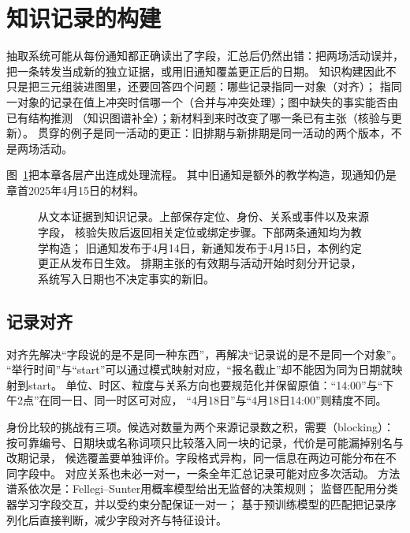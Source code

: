 \section{知识记录的构建}
\label{sec:nlp-extraction-records}

抽取系统可能从每份通知都正确读出了字段，汇总后仍然出错：把两场活动误并，
把一条转发当成新的独立证据，或用旧通知覆盖更正后的日期。
知识构建因此不只是把三元组装进图里，还要回答四个问题：哪些记录指同一对象（对齐）；
指同一对象的记录在值上冲突时信哪一个（合并与冲突处理）；图中缺失的事实能否由已有结构推测
（知识图谱补全）；新材料到来时改变了哪一条已有主张（核验与更新）。
贯穿的例子是同一活动的更正：旧排期与新排期是同一活动的两个版本，不是两场活动。

图~\ref{fig:nlp-extraction-records}把本章各层产出连成处理流程。
其中旧通知是额外的教学构造，现通知仍是章首2025年4月15日的材料。
\begin{figure}[htbp]
  \centering
  
  \caption{从文本证据到知识记录。上部保存定位、身份、关系或事件以及来源字段，
  核验失败后返回相关定位或绑定步骤。下部两条通知均为教学构造；
  旧通知发布于4月14日，新通知发布于4月15日，本例约定更正从发布日生效。
  排期主张的有效期与活动开始时刻分开记录，系统写入日期也不决定事实的新旧。}
  \label{fig:nlp-extraction-records}
\end{figure}

\subsection{记录对齐}
\label{sec:nlp-extraction-alignment}

对齐先解决“字段说的是不是同一种东西”，再解决“记录说的是不是同一个对象”。
“举行时间”与“start”可以通过模式映射对应，“报名截止”却不能因为同为日期就映射到start。
单位、时区、粒度与关系方向也要规范化并保留原值：“14:00”与“下午2点”在同一日、同一时区可对应，
“4月18日”与“4月18日14:00”则精度不同。

身份比较的挑战有三项。候选对数量为两个来源记录数之积，需要（blocking）：
按可靠编号、日期块或名称词项只比较落入同一块的记录，代价是可能漏掉别名与改期记录，
候选覆盖要单独评价。字段格式异构，同一信息在两边可能分布在不同字段中。
对应关系也未必一对一，一条全年汇总记录可能对应多次活动。
方法谱系依次是：Fellegi--Sunter用概率模型给出无监督的决策规则；
监督匹配用分类器学习字段交互，并以受约束分配保证一对一；
基于预训练模型的匹配把记录序列化后直接判断，减少字段对齐与特征设计。


